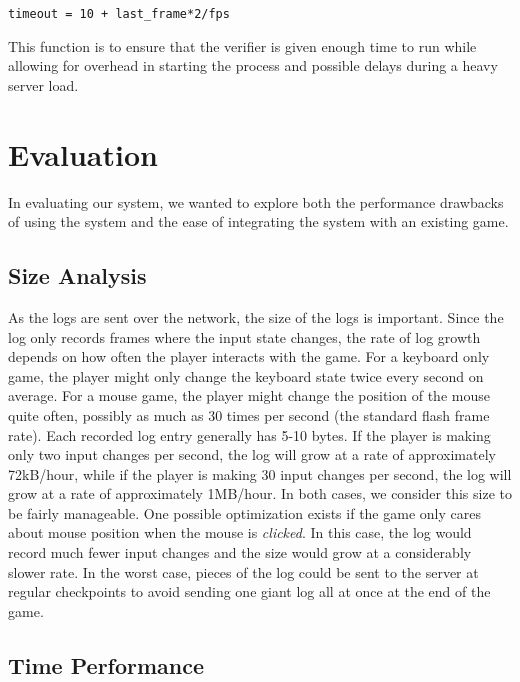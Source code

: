 \documentclass [11pt, twocolumn] {article}
\begin{document}
\begin{verbatim}
timeout = 10 + last_frame*2/fps
\end{verbatim}

This function is to ensure that the verifier is given enough time to run while allowing for overhead in starting the process and possible delays during a heavy server load. 


\section { Evaluation } 
\label{sec:evaluation}

In evaluating our system, we wanted to explore both the performance drawbacks of using the system and the ease of integrating the system with an existing game. 

\subsection {Size Analysis} 

As the logs are sent over the network, the size of the logs is important. Since the log only records frames where the input state changes, the rate of log growth depends on how often the player interacts with the game. For a keyboard only game, the player might only change the keyboard state twice every second on average. For a mouse game, the player might change the position of the mouse quite often, possibly as much as 30 times per second (the standard flash frame rate). Each recorded log entry generally has 5-10 bytes. If the player is making only two input changes per second, the log will grow at a rate of approximately 72kB/hour, while if the player is making 30 input changes per second, the log will grow at a rate of approximately 1MB/hour. In both cases, we consider this size to be fairly manageable. One possible optimization exists if the game only cares about mouse position when the mouse is \emph{clicked}. In this case, the log would record much fewer input changes and the size would grow at a considerably slower rate. In the worst case, pieces of the log could be sent to the server at regular checkpoints to avoid sending one giant log all at once at the end of the game. 

\subsection {Time Performance} 
\end{document}
